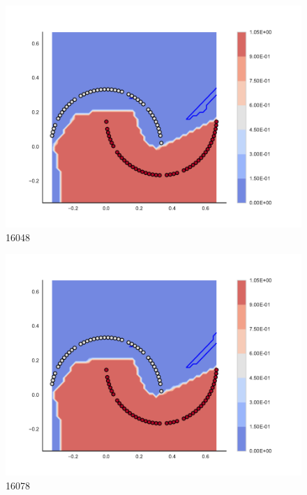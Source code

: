 \begin{subfigure}[b]{0.09\textwidth}
    \includegraphics[clip, trim=2.35cm 1.75cm 4.5cm 0cm,width=\textwidth]{img/convergence/16048.pdf}
    \caption{16048}
    \label{fig:convergence_16048}
\end{subfigure}
%
\begin{subfigure}[b]{0.09\textwidth}
    \includegraphics[clip, trim=2.35cm 1.75cm 4.5cm 0cm,width=\textwidth]{img/convergence/16078.pdf}
    \caption{16078}
    \label{fig:convergence_16078}
\end{subfigure}
%
